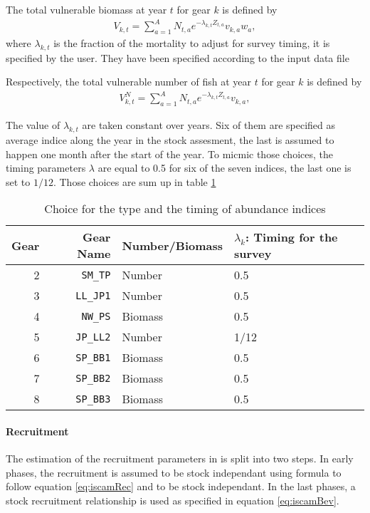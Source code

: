 The total vulnerable biomass at year $t$ for gear $k$ is defined by
\begin{gather}
V_{k,t}=\sum_{a=1}^A N_{t,a} e^{-\lambda_{k,t} Z_{t,a}} v_{k,a} w_a,
\end{gather}
 where $\lambda_{k,t}$ is the fraction  of the mortality to adjust for
 survey timing, it is specified by the user. They have been
 specified according to the input data file 
 
Respectively, the total vulnerable number of fish at year $t$ for gear $k$ is defined by
\begin{gather}
V^{N}_{k,t}=\sum_{a=1}^A N_{t,a} e^{-\lambda_{k,t} Z_{t,a}} v_{k,a},
\end{gather}
 
 
 The value of $\lambda_{k,t}$ are taken constant over years. Six of them are specified as average indice along the year in the stock assesment,
the last is assumed to happen one month after the start of the year. To micmic those choices, the timing parameters $\lambda$ are equal to 0.5 for six of the seven indices, the last one is set to $1/12$. Those choices are sum up in table \ref{table:timing} 
 
 \begin{table}[ht]
\centering
\begin{tabular}{rrp{3.5cm}p{4cm}}
  \hline
  Gear & Gear Name & Number/Biomass & $\lambda_k$: Timing for the survey\\ 
  \hline
2 & \verb+SM_TP+ & Number & 0.5 \\ 	
3 & \verb+LL_JP1+ & Number & 0.5 \\
4 & \verb+NW_PS+ & Biomass & 0.5 \\
5 & \verb+JP_LL2+ & Number & 1/12 \\
6 & \verb+SP_BB1+ & Biomass & 0.5\\
7 & \verb+SP_BB2+ & Biomass &0.5 \\
8 & \verb+SP_BB3+ & Biomass &0.5\\
\hline
\end{tabular}
\caption{Choice for the type and the timing of abundance indices}
\label{table:timing}
\end{table}
 


\paragraph{Recruitment}
The estimation of the recruitment parameters in \iscam  is split into two steps. In early phases, the recruitment is assumed to be stock independant using formula 
to follow equation \ref{eq:iscamRec} and to be stock independant. In the last phases, a stock recruitment relationship is used as specified 
in equation \ref{eq:iscamBev}. 

